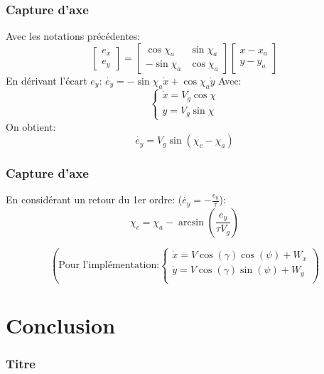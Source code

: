 \documentclass[tikz, footheight=2em]{beamer}
\begin{document}
\begin{frame}
    \frametitle{Capture d'axe} \pause{}
    Avec les notations précédentes:
    \[
    \left[
    \begin{array}{c}
        e_x \\
        e_y
    \end{array}
    \right]
    =
    \left[
    \begin{array}{cc}
        \cos \chi_a & \sin \chi_a \\
        - \sin \chi_a & \cos \chi_a
    \end{array}
    \right]
    \left[
    \begin{array}{c}
        x - x_a \\
        y - y_a
    \end{array}
    \right]
    \]
    En dérivant l'écart \( e_y \):
    \(
    \dot{e_y} = - \sin \chi_a \dot{x} + \cos \chi_a \dot{y}
    \)
    Avec:
    \[
    \left \{
    \begin{array}{l}
        \dot{x} = V_g \cos \chi \\
        \dot{y} = V_g \sin \chi
    \end{array}
    \right.
    \]
    On obtient:
    \[
    \dot{e_y} = V_g \sin (\chi_c - \chi_a)
    \]
\end{frame}

\begin{frame}
    \frametitle{Capture d'axe} \pause{}
    En considérant un retour du 1er ordre: (\( \dot{e_y} = -\frac{e_y}{\tau} \)):
    \pause{}
    \[
    \boxed{
        \chi_c = \chi_a - \arcsin (\frac{e_y}{\tau V_g})
    }
    \] \pause{}

    \[
    \left(
        \text{Pour l'implémentation:}
        \left \{
        \begin{array}{l}
            \dot{x} = V \cos (\gamma) \cos (\psi) + W_x \\
            \dot{y} = V \cos (\gamma) \sin (\psi) + W_y \\
        \end{array}
        \right.
    \right)
    \]
\end{frame}

\section{Conclusion}

\begin{frame}
    \frametitle{Titre} \pause{}

\end{frame}
\end{document}
